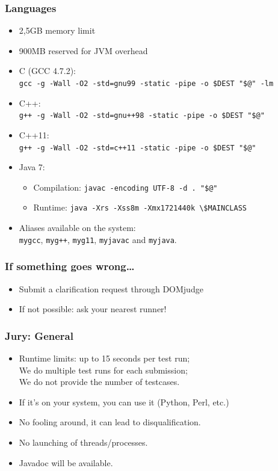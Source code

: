\documentclass[t]{beamer}
\begin{document}
\begin{frame}[fragile]
	\frametitle{Languages}
	\begin{itemize}
		\item 2,5GB memory limit
		\item 900MB reserved for JVM overhead
		\item C (GCC 4.7.2):\\    \lstinline|gcc -g -Wall -O2 -std=gnu99 -static -pipe -o $DEST "$@" -lm|
		\item C++:\\  \lstinline|g++ -g -Wall -O2 -std=gnu++98 -static -pipe -o $DEST "$@"|
		\item C++11:\\\lstinline|g++ -g -Wall -O2 -std=c++11 -static -pipe -o $DEST "$@"|
		\item Java 7:
		\begin{itemize}
			\item Compilation: \lstinline|javac -encoding UTF-8 -d . "$@"|
			\item Runtime: \lstinline|java -Xrs -Xss8m -Xmx1721440k \$MAINCLASS|
		\end{itemize}
		\item Aliases available on the system:\\
		\lstinline|mygcc|, \lstinline|myg++|, \lstinline|myg11|, \lstinline|myjavac| and \lstinline|myjava|.
	\end{itemize}
\end{frame}
\begin{frame}
	\frametitle{If something goes wrong\ldots}
	\begin{itemize}
		\item Submit a clarification request through DOMjudge
		\item If not possible: ask your nearest runner!
	\end{itemize}
\end{frame}
\begin{frame}
    \frametitle{Jury: General}
    \begin{itemize}
        \item Runtime limits: up to 15 seconds per test run;\\
              We do multiple test runs for each submission;\\
              We do not provide the number of testcases.
        \item If it's on your system, you can use it (Python, Perl, etc.)
        \item No fooling around, it can lead to disqualification.
        \item No launching of threads/processes.
        \item Javadoc will be available.
    \end{itemize}
\end{frame}
\end{document}
